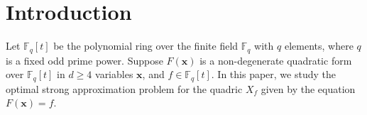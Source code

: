 \documentclass[10pt]{amsart}
\theoremstyle{plain}
\theoremstyle{plain}
\renewcommand{\vec}[1]{\mathbf{#1}}
\theoremstyle{remark}
\theoremstyle{definition}
\begin{document}
\section{Introduction}\label{intro}
Let $\mathbb{F}_q[t]$ be the polynomial ring over the finite field $\mathbb{F}_q$ with $q$ elements, where $q$ is a fixed odd prime power. Suppose $F(\vec{x})$ is a non-degenerate quadratic form over $\mathbb{F}_q[t]$ in $d\geq 4$ variables $\vec{x}$, and $f\in\mathbb{F}_q[t]$. In this paper, we study the optimal strong approximation problem for the quadric $X_f$ given by the equation $F(\vec{x})=f$.
\end{document}
